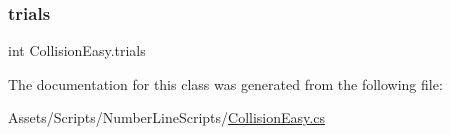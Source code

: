 \mbox{\label{classCollisionEasy_a0e9884e63dd36eb3ae64f64864a507bd}} 
\subsubsection{\texorpdfstring{trials}{trials}}
{\footnotesize\ttfamily int Collision\+Easy.\+trials}



The documentation for this class was generated from the following file\+:\begin{DoxyCompactItemize}
\item 
Assets/\+Scripts/\+Number\+Line\+Scripts/\hyperlink{CollisionEasy_8cs}{Collision\+Easy.\+cs}\end{DoxyCompactItemize}
